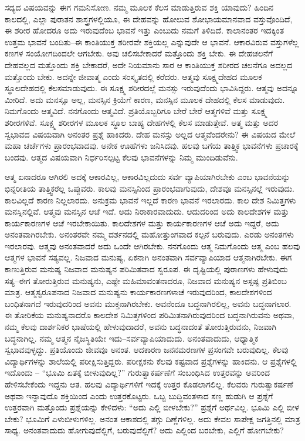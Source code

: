 ಸದ್ಯದ ವಿಷಯವನ್ನು ಈಗ ಗಮನಿಸೋಣ. ನಮ್ಮ ಮೂಲಕ ಕೆಲಸ ಮಾಡುತ್ತಿರುವ ಶಕ್ತಿ ಯಾವುದು? ಹಿಂದಿನ ಕಾಲದಲ್ಲಿ, ಎಲ್ಲಾ ಪುರಾತನ ಶಾಸ್ತ್ರಗಳಲ್ಲಿಯೂ, ಈ ದೇಹವನ್ನು ಹೋಲುವ ಶೋಭಾಯಮಾನವಾದ ವಸ್ತುವೊಂದಿದೆ, ಈ ಶರೀರ ಹೋದರೂ ಅದು ಇರುವುದೆಂಬ ಭಾವನೆ ಇತ್ತು ಎಂಬುದು ನಮಗೆ ತಿಳಿದಿದೆ. ಕಾಲಾನಂತರ ಇದಕ್ಕಿಂತ ಉತ್ತಮ ಭಾವನೆ ಬಂದಿತು–ಈ ಕಾಂತಿಯುಕ್ತ ಶರೀರವೇ ಶಕ್ತಿಯಲ್ಲ ಎನ್ನುವುದೇ ಆ ಭಾವನೆ. ಆಕಾರವಿರುವ ವಸ್ತುಗಳೆಲ್ಲ ಕಣಗಳ ಸಂಯೋಗದಿಂದಲೇ ಆಗಬೇಕು. ಅವು ಚಲಿಸಬೇಕಾದರೆ ಮತ್ತೊಂದು ಶಕ್ತಿ ಬೇಕು. ಈ ದೇಹಚಲನೆಗೆ ದೇಹವಲ್ಲದ ಮತ್ತೊಂದು ಶಕ್ತಿ ಬೇಕಾದರೆ, ಅದೇ ನಿಯಮಾನು ಸಾರ ಆ ಕಾಂತಿಯುಕ್ತ ಶರೀರದ ಚಲನೆಗೂ ಅದಲ್ಲದ ಮತ್ತೊಂದು ಬೇಕು. ಅದನ್ನೇ ಜೀವಾತ್ಮ ಎಂದು ಸಂಸ್ಕೃತದಲ್ಲಿ ಕರೆದರು. ಆತ್ಮವು ಸೂಕ್ಷ್ಮದೇಹದ ಮೂಲಕ ಸ್ಥೂಲದೇಹದಲ್ಲಿ ಕೆಲಸಮಾಡುವುದು. ಈ ಸೂಕ್ಷ್ಮ ಶರೀರದಲ್ಲೆ ಮನಸ್ಸು ಇರುವುದೆಂದು ಭಾವಿಸಿದ್ದರು. ಆತ್ಮವು ಅದನ್ನೂ ಮೀರಿದೆ. ಅದು ಮನಸ್ಸೂ ಅಲ್ಲ, ಮನಸ್ಸಿನ ಕ್ರಿಯೆಗೆ ಕಾರಣ, ಮನಸ್ಸಿನ ಮೂಲಕ ದೇಹದಲ್ಲಿ ಕೆಲಸ ಮಾಡುವುದು. ನಿಮಗೊಂದು ಆತ್ಮವಿದೆ. ನನಗೊಂದು ಆತ್ಮವಿದೆ. ಪ್ರತಿಯೊಬ್ಬರಿಗೂ ಬೇರೆ ಬೇರೆ ಆತ್ಮಗಳಿವೆ ಮತ್ತು ಸೂಕ್ಷ್ಮ ಶರೀರಗಳಿವೆ. ಸೂಕ್ಷ್ಮ ಶರೀರಗಳ ಮೂಲಕ ಸ್ಥೂಲ ಬಾಹ್ಯ ದೇಹಗಳಲ್ಲಿ ಕೆಲಸ ಮಾಡುತ್ತೇವೆ. ಆತ್ಮ ಮತ್ತು ಅದರ ಸ್ವಭಾವದ ವಿಷಯವಾಗಿ ಅನಂತರ ಪ್ರಶ್ನೆ ಹಾಕಿದರು. ದೇಹ ಮನಸ್ಸು ಅಲ್ಲದ ಆತ್ಮವೆಂದರೇನು? ಈ ವಿಷಯದ ಮೇಲೆ ಮಹಾ ಚರ್ಚೆಗಳು ಪ್ರಾರಂಭವಾದವು. ಅನೇಕ ಊಹೆಗಳು ಜನಿಸಿದವು. ಹಲವು ಬಗೆಯ ತಾತ್ತ್ವಿಕ ಭಾವನೆಗಳು ಪ್ರಚಾರಕ್ಕೆ ಬಂದವು. ಆತ್ಮದ ವಿಷಯವಾಗಿ ನಿರ್ಧರಿಸಲ್ಪಟ್ಟ ಕೆಲವು ಭಾವನೆಗಳನ್ನು ನಿಮ್ಮ ಮುಂದಿಡುವೆನು.

ಆತ್ಮ ಏನಾದರೂ ಆಗಿರಲಿ ಅದಕ್ಕೆ ಆಕಾರವಿಲ್ಲ, ಆಕಾರವಿಲ್ಲದುದು ಸರ್ವ ವ್ಯಾಪಿಯಾಗಿರಬೇಕು ಎಂಬ ಭಾವನೆಯನ್ನು ಭಿನ್ನರೀತಿಯ ತಾತ್ತ್ವಿಕರೆಲ್ಲ ಒಪ್ಪುವರು. ಕಾಲವು ಮನಸ್ಸಿನಿಂದ ಪ್ರಾರಂಭವಾಗುವುದು, ದೇಶವೂ ಮನಸ್ಸಿನಲ್ಲೆ ಇರುವುದು. ಕಾಲವಿಲ್ಲದೆ ಕಾರಣ ನಿಲ್ಲಲಾರದು. ಅನುಕ್ರಮ ಭಾವನೆ ಇಲ್ಲದೆ ಕಾರಣ ಭಾವನೆ ಇರಲಾರದು. ಕಾಲ ದೇಶ ನಿಮಿತ್ತಗಳು ಮನಸ್ಸಿನಲ್ಲಿವೆ. ಆತ್ಮವು ಮನಸ್ಸಿನ ಆಚೆ ಇದೆ. ಅದು ನಿರಾಕಾರವಾದುದು. ಆದುದರಿಂದ ಅದು ಕಾಲದೇಶಗಳ ಮತ್ತು ಕಾರ್ಯಕಾರಣಗಳ ಆಚೆ ಇರಬೇಕಾಯಿತು. ಕಾಲದೇಶಗಳ ಮತ್ತು ಕಾರ್ಯಕಾರಣಗಳ ಆಚೆ ಅದು ಇದ್ದರೆ, ಅದು ಅನಂತವಾಗಿರಬೇಕು. ಅನಂತರವೇ ನಮ್ಮ ದರ್ಶನದಲ್ಲಿ ಮಹೋತ್ತುಂಗವಾದ ಕಲ್ಪನೆ ಬರುವುದು. ಎರಡು ಅನಂತಗಳು ಇರಲಾರವು. ಆತ್ಮವು ಅನಂತವಾದರೆ ಅದು ಒಂದೇ ಆಗಿರಬೇಕು. ನನಗೊಂದು ಆತ್ಮ ನಿಮಗೊಂದು ಆತ್ಮ ಎಂಬ ಹಲವು ಆತ್ಮಗಳ ಭಾವನೆ ಸತ್ಯವಲ್ಲ. ನಿಜವಾದ ಮನುಷ್ಯ, ಏಕನಾಗಿ ಅನಂತವಾಗಿ ಸರ್ವವ್ಯಾಪಿಯಾದ ಆತ್ಮನಾಗಿರಬೇಕು. ಈಗ ಕಾಣುತ್ತಿರುವ ಮನುಷ್ಯ ನಿಜವಾದ ಮನುಷ್ಯನ ಪರಿಮಿತವಾದ ಸ್ವರೂಪ. ಈ ದೃಷ್ಟಿಯಲ್ಲಿ ಪುರಾಣಗಳು ಹೇಳುವುದು ಸತ್ಯ–ಈಗ ತೋರುತ್ತಿರುವ ಮನುಷ್ಯನು, ಎಷ್ಟೇ ಮಹಿಮಾವಂತನಾದರೂ, ನಿಜವಾದ ಮನುಷ್ಯನ ಅಸ್ಪಷ್ಟ ಪ್ರತಿಬಿಂಬ ಮಾತ್ರ. ಆತ್ಮಸ್ವರೂಪನಾದ ನಿಜವಾದ ಮನುಷ್ಯನು ಕಾರ್ಯಕಾರಣಗಳಾಚೆ ಇರುವುದರಿಂದ, ಕಾಲದೇಶಗಳಿಂದ ಬಂಧಿತನಾಗದೆ ಇರುವುದರಿಂದ ಅವನು ಮುಕ್ತನಾಗಿರಬೇಕು. ಅವನೆಂದೂ ಬದ್ಧನಾಗಿರಲಿಲ್ಲ, ಅವನು ಬದ್ಧನಾಗಲಾರ. ಈ ತೋರಿಕೆಯ ಮನುಷ್ಯನಾದರೊ ಕಾಲದೇಶ ನಿಮಿತ್ತಗಳಿಂದ ಪರಿಮಿತನಾಗಿರುವುದರಿಂದ ಬದ್ಧನಾಗಿರುವನು ಅಥವಾ, ನಮ್ಮ ಕೆಲವು ದಾರ್ಶನಿಕರ ಭಾಷೆಯಲ್ಲಿ ಹೇಳುವುದಾದರೆ, ಅವನು ಬದ್ಧನಾದಂತೆ ತೋರುತ್ತಿರುವನು, ನಿಜವಾಗಿ ಬದ್ಧನಾಗಿಲ್ಲ. ನಮ್ಮ ಆತ್ಮನ ನೈಜಸ್ಥಿತಿಯೇ ಇದು–ಸರ್ವವ್ಯಾಪಿಯಾದುದು. ಅನಂತವಾದುದು, ಆಧ್ಯಾತ್ಮಿಕ ಸ್ವಭಾವವುಳ್ಳದ್ದು. ಪ್ರತಿಯೊಂದು ಜೀವವೂ ಅನಂತ. ಆದಕಾರಣ ಜನನಮರಣಗಳ ಪ್ರಸಂಗವೇ ಬರುವುದಿಲ್ಲ. ಕೆಲವು ವಿದ್ಯಾರ್ಥಿಗಳನ್ನು ಶಾಲೆಯಲ್ಲಿ ಪರೀಕ್ಷಿಸುತ್ತಿದ್ದರು. ಪರೀಕ್ಷಕನು ಕೆಲವು ಕಷ್ಟವಾದ ಪ್ರಶ್ನೆಗಳನ್ನು ಹಾಕಿದನು. ಆ ಪ್ರಶ್ನೆಗಳಲ್ಲಿ ಇದೊಂದು – “ಭೂಮಿ ಏತಕ್ಕೆ ಬೀಳುವುದಿಲ್ಲ?” ಗುರುತ್ವಾಕರ್ಷಣೆಗೆ ಸಂಬಂಧಿಸಿದ ಉತ್ತರವನ್ನು ಅವರಿಂದ ಹೇಳಿಸಬೇಕೆಂದು ಇದ್ದನು ಆತ. ಹಲವು ವಿದ್ಯಾರ್ಥಿಗಳಿಗೆ ಇದಕ್ಕೆ ಉತ್ತರ ಕೊಡಲಾಗಲಿಲ್ಲ. ಕೆಲವರು ಗುರುತ್ವಾಕರ್ಷಣೆ ಅಥವಾ ಇನ್ನಾವುದೊ ಶಕ್ತಿಯಿಂದ ಎಂದು ಉತ್ತರಕೊಟ್ಟರು. ಒಬ್ಬ ಬುದ್ಧಿವಂತಳಾದ ಸಣ್ಣ ಹುಡುಗಿ ಆ ಪ್ರಶ್ನೆಗೆ ಉತ್ತರವಾಗಿ ಮತ್ತೊಂದು ಪ್ರಶ್ನೆಯನ್ನು ಕೇಳಿದಳು: “ಅದು ಎಲ್ಲಿ ಬೀಳಬೇಕು?” ಪ್ರಶ್ನೆಗೆ ಅರ್ಥವಿಲ್ಲ. ಭೂಮಿ ಎಲ್ಲಿ ಬೀಳ ಬೇಕು? ಭೂಮಿಗೆ ಏಳುಬೀಳುಗಳಿಲ್ಲ. ಅನಂತ ಆಕಾಶದಲ್ಲಿ ತಗ್ಗು ದಿಣ್ಣೆಗಳಿಲ್ಲ. ಅದು ಕೇವಲ ಸಾಪೇಕ್ಷ ಜಗತ್ತಿನಲ್ಲಿ ಮಾತ್ರ ಸಾಧ್ಯ. ಅನಂತವಾದುದು ಹೋಗುವುದೆಲ್ಲಿಗೆ, ಬರುವುದೆಲ್ಲಿಗೆ? ಅದು ಎಲ್ಲಿಂದ ಬರಬೇಕು, ಎಲ್ಲಿಗೆ ಹೋಗಬೇಕು?

